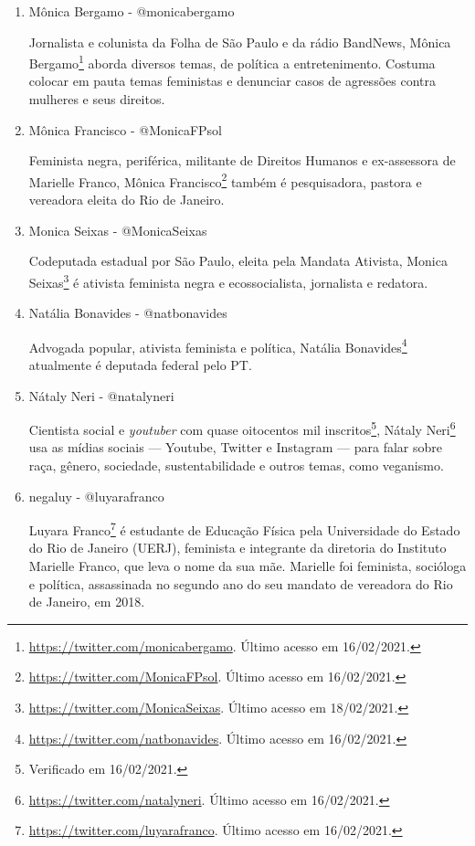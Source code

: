\documentclass[
	12pt,				%
	openright,			%
	twoside,			%
	a4paper,			%
	english,			%
	brazil				%
	]{abntex2}
\begin{document}
\begin{anexosenv}
\begin{enumerate}
 \item Mônica Bergamo - @monicabergamo
 
 Jornalista e colunista da Folha de São Paulo e da rádio BandNews, Mônica Bergamo\footnote{\url{https://twitter.com/monicabergamo}. Último acesso em 16/02/2021.} aborda diversos temas, de política a entretenimento. Costuma colocar em pauta temas feministas e denunciar casos de agressões contra mulheres e seus direitos.

 \item Mônica Francisco - @MonicaFPsol
 
 Feminista negra, periférica, militante de Direitos Humanos e ex-assessora de Marielle Franco, Mônica Francisco\footnote{\url{https://twitter.com/MonicaFPsol}. Último acesso em 16/02/2021.} também é pesquisadora, pastora e vereadora eleita do Rio de Janeiro.

 \item Monica Seixas - @MonicaSeixas
 
 Codeputada estadual por São Paulo, eleita pela Mandata Ativista, Monica Seixas\footnote{\url{https://twitter.com/MonicaSeixas}. Último acesso em 18/02/2021.} é ativista feminista negra e ecossocialista, jornalista e redatora.

 \item Natália Bonavides - @natbonavides
 
 Advogada popular, ativista feminista e política, Natália Bonavides\footnote{\url{https://twitter.com/natbonavides}. Último acesso em 16/02/2021.} atualmente é deputada federal pelo PT.

 \item Nátaly Neri - @natalyneri
 
 Cientista social e \textit{youtuber} com quase oitocentos mil inscritos\footnote{Verificado em 16/02/2021.}, Nátaly Neri\footnote{\url{https://twitter.com/natalyneri}. Último acesso em 16/02/2021.} usa as mídias sociais --- Youtube, Twitter e Instagram --- para falar sobre raça, gênero, sociedade, sustentabilidade e outros temas, como veganismo.

 \item negaluy - @luyarafranco\label{luyfranco}
 
 Luyara Franco\footnote{\url{https://twitter.com/luyarafranco}. Último acesso em 16/02/2021.} é estudante de Educação Física pela Universidade do Estado do Rio de Janeiro (UERJ), feminista e integrante da diretoria do Instituto Marielle Franco, que leva o nome da sua mãe. Marielle foi feminista, socióloga e política, assassinada no segundo ano do seu mandato de vereadora do Rio de Janeiro, em 2018.


\end{enumerate}
\end{anexosenv}
\end{document}
